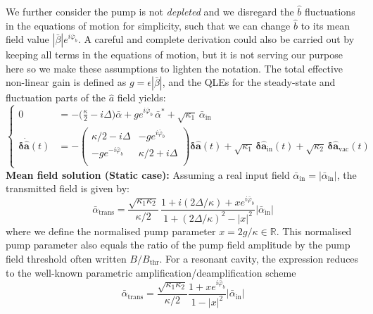 We further consider the pump is not \textit{depleted} and we disregard the $\hat{b}$ fluctuations in the equations of motion for simplicity, such that we can change $\hat{b}$ to its mean field value $|\bar{\beta}|e^{i\bar{\varphi}_b}$. A careful and complete derivation could also be carried out by keeping all terms in the equations of motion, but it is not serving our purpose here so we make these assumptions to lighten the notation. The total effective non-linear gain is defined as $g = \epsilon |\bar\beta|$, and the QLEs for the steady-state and fluctuation parts of the $\hat{a}$ field yields: 
 \begin{equation}
  \left\{
  \begin{split}
  0 &= -\Big(\frac{\kappa}{2}-i\Delta\Big) \bar{\alpha} +g e^{i\bar{\varphi}_b} \, \bar{\alpha}^* + \sqrt{\kappa_1} \, \bar{\alpha}_{\mathrm{in}} \\
  \mathbf{\delta \dot{\hat{a}}}(t)&= - \begin{pmatrix}
  \kappa/2-i\Delta & -g e^{i\bar{\varphi}_b}\\
   -g e^{-i\bar{\varphi}_b} & \kappa/2+i\Delta \\
  \end{pmatrix}  \mathbf{\delta \hat{a}}(t) + \sqrt{\kappa_{\mathrm{1}}} \, \mathbf{\delta \hat{a}_{\mathrm{in}}}(t)  + \sqrt{\kappa_2} \, \mathbf{\delta \hat{a}_{\mathrm{vac}}}(t)
  \end{split}
  \right.
\end{equation}
\noindent \textbf{Mean field solution (Static case): }
Assuming a real input field $\bar{\alpha}_\textrm{in}=|\bar{\alpha}_\textrm{in}|$, the transmitted field is given by: 
\begin{equation}
   \bar{\alpha}_{\mathrm{trans}} = \frac{\sqrt{\kappa_1\kappa_2}}{\kappa/2} \, \frac{1+i\left(2\Delta/\kappa\right)+xe^{i\bar{\varphi}_b}}{1+\left({2\Delta}/{\kappa}\right)^2 - |x|^2}  |\bar{\alpha}_\textrm{in}|
\end{equation}
where we define the normalised pump parameter $x = 2g / \kappa \in\mathbb{R}$. This normalised pump parameter also equals the ratio of the pump field amplitude by the pump field threshold often written $B/B_{\mathrm{thr}}$. For a resonant cavity, the expression reduces to the well-known parametric amplification/deamplification scheme 
\begin{equation}
   \bar{\alpha}_{\mathrm{trans}} =  \frac{\sqrt{\kappa_1\kappa_2}}{\kappa/2}\frac{1+x e^{i\bar{\varphi}_b}}{1 - |x|^2} | \bar{\alpha}_\textrm{in} |
\end{equation}
